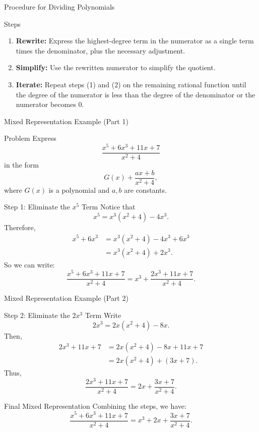 \documentclass{beamer}
\begin{document}
\begin{frame}{Procedure for Dividing Polynomials}
  \begin{block}{Steps}
    \begin{enumerate}
      \item \textbf{Rewrite:} Express the highest-degree term in the numerator as a single term times the denominator, plus the necessary adjustment.
      \item \textbf{Simplify:} Use the rewritten numerator to simplify the quotient.
      \item \textbf{Iterate:} Repeat steps (1) and (2) on the remaining rational function until the degree of the numerator is less than the degree of the denominator or the numerator becomes 0.
    \end{enumerate}
  \end{block}
\end{frame}

\begin{frame}{Mixed Representation Example (Part 1)}
  \begin{exampleblock}{Problem}
    Express
    \[
      \frac{x^5+6x^3+11x+7}{x^2+4}
    \]
    in the form
    \[
      G(x)+\frac{ax+b}{x^2+4},
    \]
    where \(G(x)\) is a polynomial and \(a, b\) are constants.
  \end{exampleblock}
\end{frame}
\begin{frame}
  \begin{block}{Step 1: Eliminate the \(x^5\) Term}
    Notice that
    \[
      x^5=x^3(x^2+4)-4x^3.
    \]
    Therefore,
    \[
    \begin{aligned}
      x^5+6x^3 &= x^3(x^2+4)-4x^3+6x^3\\[1mm]
               &= x^3(x^2+4)+2x^3.
    \end{aligned}
    \]
    So we can write:
    \[
      \frac{x^5+6x^3+11x+7}{x^2+4}=x^3+\frac{2x^3+11x+7}{x^2+4}.
    \]
  \end{block}
\end{frame}

\begin{frame}{Mixed Representation Example (Part 2)}
  \begin{block}{Step 2: Eliminate the \(2x^3\) Term}
    Write
    \[
      2x^3=2x(x^2+4)-8x.
    \]
    Then,
    \[
    \begin{aligned}
      2x^3+11x+7 &= 2x(x^2+4)-8x+11x+7\\[1mm]
                  &= 2x(x^2+4)+(3x+7).
    \end{aligned}
    \]
    Thus,
    \[
      \frac{2x^3+11x+7}{x^2+4}=2x+\frac{3x+7}{x^2+4}.
    \]
  \end{block}
\end{frame} 
\begin{frame}
  \begin{block}{Final Mixed Representation}
    Combining the steps, we have:
    \[
      \frac{x^5+6x^3+11x+7}{x^2+4}=x^3+2x+\frac{3x+7}{x^2+4}.
    \]
  \end{block}
\end{frame}
\end{document}
